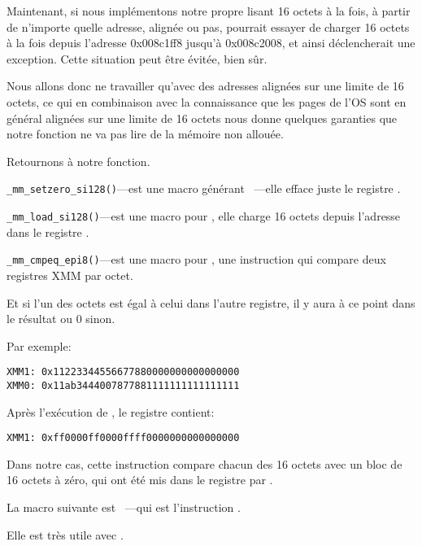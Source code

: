 Maintenant, si nous implémentons notre propre \strlen lisant 16 octets à la fois,
à partir de n'importe quelle adresse, alignée ou pas, \MOVDQU pourrait essayer de
charger 16 octets à la fois depuis l'adresse 0x008c1ff8 jusqu'à 0x008c2008, et ainsi
déclencherait une exception.
Cette situation peut être évitée, bien sûr.

Nous allons donc ne travailler qu'avec des adresses alignées sur une limite de 16
octets, ce qui en combinaison avec la connaissance que les pages de l'\ac{OS} sont
en général alignées sur une limite de 16 octets nous donne quelques garanties que
notre fonction ne va pas lire de la mémoire non allouée.

Retournons à notre fonction.

\verb|_mm_setzero_si128()|---est une macro générant ~---elle
efface juste le registre .

\verb|_mm_load_si128()|---est une macro pour \MOVDQA, elle charge 16 octets depuis l'adresse dans le registre .

\verb|_mm_cmpeq_epi8()|---est une macro pour \PCMPEQB, une instruction qui compare deux registres XMM par octet.

Et si l'un des octets est égal à celui dans l'autre registre, il y aura 
à ce point dans le résultat ou 0 sinon.

Par exemple:

\begin{verbatim}
XMM1: 0x11223344556677880000000000000000
XMM0: 0x11ab3444007877881111111111111111
\end{verbatim}

Après l'exécution de , le registre  contient:

\begin{verbatim}
XMM1: 0xff0000ff0000ffff0000000000000000
\end{verbatim}

Dans notre cas, cette instruction compare chacun des 16 octets avec un bloc de 16
octets à zéro, qui ont été mis dans le registre  par .


La macro suivante est ~---qui est l'instruction .

Elle est très utile avec \PCMPEQB.


